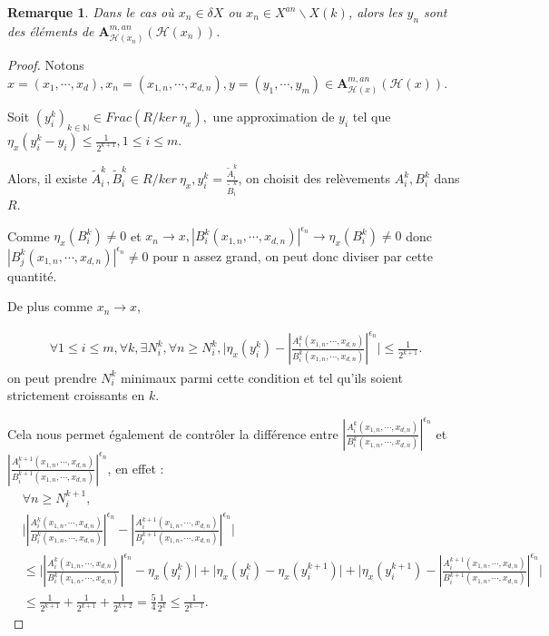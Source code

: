 \documentclass[11pt]{article}
\newcommand{\N}{\mathbb{N}}
\newcommand{\ana}{\mathbf{A}}
\newtheorem{rem}[thm]{Remarque}
\begin{document}
\begin{rem}
Dans le cas où $x_n \in \delta X$ ou $x_n \in X^{an}\backslash X(k)$, alors les $y_n$ sont des éléments de $\ana^{m,an}_{\mathcal{H}(x_n)}(\mathcal{H}(x_n))$.
\end{rem}
\begin{proof}
Notons $x = (x_1, \cdots, x_d), x_n = (x_{1,n}, \cdots, x_{d,n}), y = (y_1, \cdots, y_m) \in \ana^{m,an}_{\mathcal{H}(x)}(\mathcal{H}(x))$.

Soit $(y_{i}^k)_{k \in \N} \in Frac(R/ker~\eta_x),$ une approximation de $y_{i}$ tel que $\eta_x(y_{i}^k - y_{i}) \leq \frac{1}{2^{k+1}}, 1\leq i\leq m.$ 

Alors, il existe $\tilde{A}_{i}^k, \tilde{B}_{i}^k \in R/ker~\eta_x, y_{i}^k = \frac{\tilde{A}_{i}^k}{\tilde{B}_{i}^k}$, on choisit des relèvements $A_{i}^k, B_{i}^k$ dans $R$.

Comme $\eta_x(B_{i}^k) \neq 0$ et $x_n \rightarrow x, |B^k_{i}(x_{1,n}, \cdots, x_{d,n})|^{\epsilon_n} \rightarrow \eta_x(B_{i}^k) \neq 0 $ donc $|B^k_{j}(x_{1,n}, \cdots, x_{d,n})|^{\epsilon_n} \neq 0$ pour n assez grand, on peut donc diviser par cette quantité. 

De plus comme $x_n \rightarrow x$,

\begin{align*}
\forall 1\leq i \leq m, \forall k, \exists N_{i}^k, \forall n \geq N_{i}^k, \Biggr\lvert \eta_x(y_{i}^k) - |\frac{A^k_{i}(x_{1,n}, \cdots, x_{d,n})}{B^k_{i}(x_{1,n}, \cdots, x_{d,n})}|^{\epsilon_n}\Biggr\rvert \leq \frac{1}{2^{k+1}}.
\end{align*}
on peut prendre $N_{i}^k$ minimaux parmi cette condition et tel qu'ils soient strictement croissants en $k$.

Cela nous permet également de contrôler la différence entre $|\frac{A^k_{i}(x_{1,n}, \cdots, x_{d,n})}{B^k_{i}(x_{1,n}, \cdots, x_{d,n})}|^{\epsilon_n}$ et $|\frac{A^{k+1}_{i}(x_{1,n}, \cdots, x_{d,n})}{B^{k+1}_{i}(x_{1,n}, \cdots, x_{d,n})}|^{\epsilon_n}$, en effet :
\begin{align}\label{controle diff entre A^k/B^k et A^k+1/B^k+1}
&\forall n \geq N_{i}^{k+1},\nonumber\\
&\Biggr\lvert|\frac{A^k_{i}(x_{1,n}, \cdots, x_{d,n})}{B^k_{i}(x_{1,n}, \cdots, x_{d,n})}|^{\epsilon_n} - |\frac{A^{k+1}_{i}(x_{1,n}, \cdots, x_{d,n})}{B^{k+1}_{i}(x_{1,n}, \cdots, x_{d,n})}|^{\epsilon_n} \Biggr\rvert \nonumber\\
&\leq \Biggr\lvert |\frac{A^k_{i}(x_{1,n}, \cdots, x_{d,n})}{B^k_{i}(x_{1,n}, \cdots, x_{d,n})}|^{\epsilon_n} - \eta_x(y_{i}^k)\Biggr\rvert + \Biggr\lvert \eta_x(y_{i}^k) - \eta_x(y_{i}^{k+1}) \Biggr\rvert +  \Biggr\lvert\eta_x(y_{i}^{k+1}) - |\frac{A^{k+1}_{i}(x_{1,n}, \cdots, x_{d,n})}{B^{k+1}_{i}(x_{1,n}, \cdots, x_{d,n})}|^{\epsilon_n}\Biggr\rvert \nonumber\\
&\leq \frac{1}{2^{k+1}} + \frac{1}{2^{k+1}} + \frac{1}{2^{k+2}} = \frac{5}{4} \frac{1}{2^k} \leq \frac{1}{2^{k-1}}.
\end{align}


\end{proof}
\end{document}
